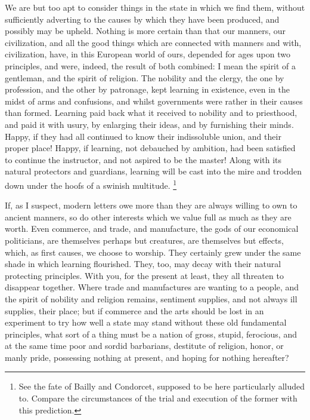 We are but too apt to consider things in the state in which we find them, without sufficiently adverting to the causes by which they have been produced, and possibly may be upheld. Nothing is more certain than that our manners, our civilization, and all the good things which are connected with manners and with, civilization, have, in this European world of ours, depended for ages upon two principles, and were, indeed, the result of both combined: I mean the spirit of a gentleman, and the spirit of religion. The nobility and the clergy, the one by profession, and the other by patronage, kept learning in existence, even in the midst of arms and confusions, and whilst governments were rather in their causes than formed. Learning paid back what it received to nobility and to priesthood, and paid it with usury, by enlarging their ideas, and by furnishing their minds. Happy, if they had all continued to know their indissoluble union, and their proper place! Happy, if learning, not debauched by ambition, had been satisfied to continue the instructor, and not aspired to be the master! Along with its natural protectors and guardians, learning will be cast into the mire and trodden down under the hoofs of a swinish multitude.
\footnote{ See the fate of Bailly and Condorcet, supposed to be here particularly alluded to. Compare the circumstances of the trial and execution of the former with this prediction.}


If, as I suspect, modern letters owe more than they are always willing to own to ancient manners, so do other interests which we value full as much as they are worth. Even commerce, and trade, and manufacture, the gods of our economical politicians, are themselves perhaps but creatures, are themselves but effects, which, as first causes, we choose to worship. They certainly grew under the same shade in which learning flourished. They, too, may decay with their natural protecting principles. With you, for the present at least, they all threaten to disappear together. Where trade and manufactures are wanting to a people, and the spirit of nobility and religion remains, sentiment supplies, and not always ill supplies, their place; but if commerce and the arts should be lost in an experiment to try how well a state may stand without these old fundamental principles, what sort of a thing must be a nation of gross, stupid, ferocious, and at the same time poor and sordid barbarians, destitute of religion, honor, or manly pride, possessing nothing at present, and hoping for nothing hereafter?

